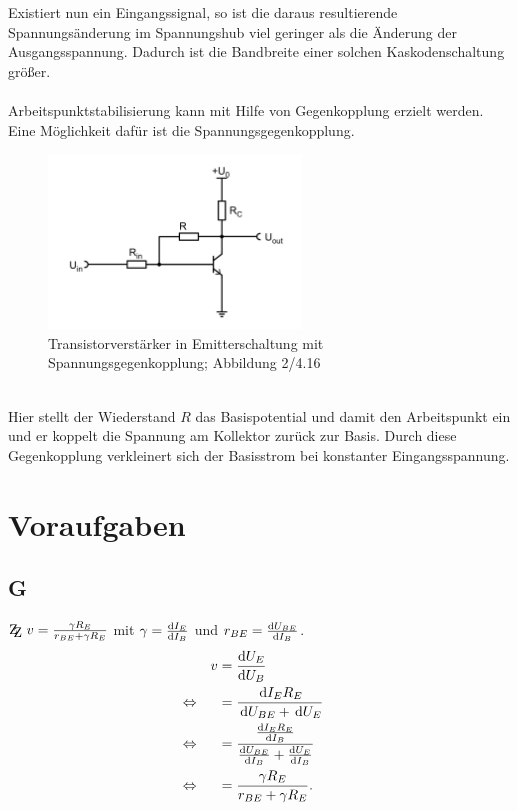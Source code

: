 \documentclass[a4paper,10pt]{article}
\newcommand{\td}{\,\text{d}}
\newcommand{\zz}{\mathrm{Z\kern-.3em\raise-0.5ex\hbox{Z} }}
\numberwithin{equation}{section}
\begin{document}
\begin{multicols}{2}
        Existiert nun ein Eingangssignal, so ist die daraus resultierende Spannungsänderung im Spannungshub viel geringer als die Änderung der Ausgangsspannung.
        Dadurch ist die Bandbreite einer solchen Kaskodenschaltung größer.
        \\\\Arbeitspunktstabilisierung kann mit Hilfe von Gegenkopplung erzielt werden.
        Eine Möglichkeit dafür ist die Spannungsgegenkopplung.
        \begin{figure}[h]
                \centering
                \includegraphics[width=0.6\textwidth]{spannungsgegenkopplung.png}
                \caption{Transistorverstärker in Emitterschaltung mit Spannungsgegenkopplung; Abbildung 2/4.16 \cite{Praktikumsanleitung}}
                \vspace{100cm}
        \end{figure}\\
        Hier stellt der Wiederstand $R$ das Basispotential und damit den Arbeitspunkt ein und er koppelt die Spannung am Kollektor zurück zur Basis.
        Durch diese Gegenkopplung verkleinert sich der Basisstrom bei konstanter Eingangsspannung.

        \clearpage
        \section{Voraufgaben}
        \subsection{G}
        $\zz\ v=\tfrac{\gamma R_E}{r_{BE}+\gamma R_E}$ mit $\gamma =\diff[]{I_E}{I_B}$ und $r_{BE}=\diff[]{U_{BE}}{I_B}$.
        \begin{align} 
                && v &= \diff[]{U_E}{U_B} &&\\
                \Leftrightarrow && &= \dfrac{\td I_ER_E}{\td U_{BE}+\td U_E} &&\nonumber \\
                \Leftrightarrow && &= \dfrac{\diff[]{I_ER_E}{I_B}}{\diff[]{U_{BE}}{I_B}+\diff[]{U_E}{I_B}} &&\nonumber \\
                \Leftrightarrow && &= \dfrac{\gamma R_E}{r_{BE}+\gamma R_E}. &&
        \end{align} 


\end{multicols}
\end{document}
